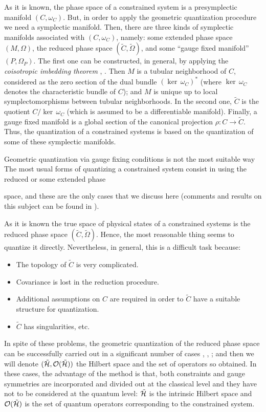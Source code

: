 \documentclass[12pt]{article}
\def\Hr{\tilde{\cal H}}
\def\rps{(\tilde C,\tilde\Omega )}
\begin{document}
As it is known,  the phase space of a constrained system is a
presymplectic manifold $(C,\omega_C)$. But, in order to apply the
geometric quantization procedure we need a symplectic manifold.
Then, there are three kinds of symplectic manifolds associated
with $(C,\omega_C)$, namely: some extended phase space $(M,\Omega
)$, the reduced phase space $\rps$, and some ``gauge fixed
manifold'' $(P,\Omega_P)$. The first one can be constructed, in
general, by applying the {\it coisotropic imbedding theorem}
\cite{Go-cit}, \cite{Ma-src}. Then $M$ is a tubular neighborhood
of $C$, considered as the zero section of the dual bundle
$(\ker\,\omega_C)^*$ (where $\ker\,\omega_C$ denotes the
characteristic bundle of $C$); and $M$ is unique up to local
symplectomorphisms between tubular neighborhoods. In the second
one, $\tilde C$ is the quotient $C/\ker\,\omega_C$ (which is
assumed to be a differentiable manifold). Finally, a gauge fixed
manifold is a global section of the canonical projection
$\rho\colon C\to\tilde C$. Thus, the quantization of a constrained
systems is based on the quantization of some of these symplectic
manifolds.

Geometric quantization via gauge fixing conditions
is not the most suitable way
The most usual forms of quantizing
a constrained system consist in using the reduced or some extended phase

space,
and these are the only cases that we discuss here
(comments and results on this subject can be found in \cite{Sn-83}).

As it is known the true space of physical states of a constrained
systems
is the reduced phase space $\rps$.
Hence, the most reasonable thing seems to quantize it directly.
Nevertheless, in general, this is a difficult task because:
\begin{itemize}
\item
The topology of $\tilde C$ is very complicated.
\item
Covariance is lost in the reduction procedure.
\item
Additional assumptions on $C$ are required in order to
$\tilde C$ have a suitable structure for quantization.
\item
$\tilde C$ has singularities, etc.
\end{itemize}
In spite of these problems, the geometric quantization
of the reduced phase space can be successfully carried out
in a significant number of cases \cite{AS-86}, \cite{Go-86},
\cite{Va-83};
and then we will denote $(\Hr ,{\cal O}(\Hr ))$
the Hilbert space  and the set of operators so obtained.
In these cases, the advantage of the method is that,
both constraints and gauge symmetries are incorporated
and divided out at the classical level and they
have not to be considered at the quantum level:
$\Hr$ is the intrinsic Hilbert space and ${\cal O}(\Hr )$ is the set of
quantum operators
corresponding to the constrained system.
\end{document}

